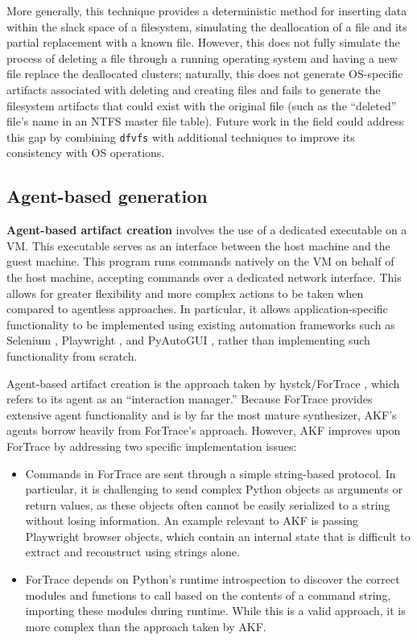 \documentclass[final,5p,times,twocolumn]{elsarticle}
\newcommand{\passthrough}[1]{#1}
\begin{document}
More generally, this technique provides a deterministic method for
inserting data within the slack space of a filesystem, simulating the
deallocation of a file and its partial replacement with a known file.
However, this does not fully simulate the process of deleting a file
through a running operating system and having a new file replace the
deallocated clusters; naturally, this does not generate OS-specific
artifacts associated with deleting and creating files and fails to
generate the filesystem artifacts that could exist with the original
file (such as the ``deleted'' file's name in an NTFS master file table).
Future work in the field could address this gap by combining
\passthrough{\lstinline!dfvfs!} with additional techniques to improve
its consistency with OS operations.

\subsection{Agent-based generation}\label{agent-based-generation}

\textbf{Agent-based artifact creation} involves the use of a dedicated
executable on a VM. This executable serves as an interface between the
host machine and the guest machine. This program runs commands natively
on the VM on behalf of the host machine, accepting commands over a
dedicated network interface. This allows for greater flexibility and
more complex actions to be taken when compared to agentless approaches.
In particular, it allows application-specific functionality to be
implemented using existing automation frameworks such as Selenium
\cite{SeleniumHQSelenium2025}, Playwright
\cite{MicrosoftPlaywrightpython2025}, and PyAutoGUI
\cite{sweigartAsweigartPyautogui2025}, rather than implementing such
functionality from scratch.

Agent-based artifact creation is the approach taken by hystck/ForTrace
\cite{gobelNovelApproachGenerating2020,gobelForTraceHolisticForensic2022},
which refers to its agent as an ``interaction manager.'' Because
ForTrace provides extensive agent functionality and is by far the most
mature synthesizer, AKF's agents borrow heavily from ForTrace's
approach. However, AKF improves upon ForTrace by addressing two specific
implementation issues:

\begin{itemize}
\item
  Commands in ForTrace are sent through a simple string-based protocol.
  In particular, it is challenging to send complex Python objects as
  arguments or return values, as these objects often cannot be easily
  serialized to a string without losing information. An example relevant
  to AKF is passing Playwright browser objects, which contain an
  internal state that is difficult to extract and reconstruct using
  strings alone.
\item
  ForTrace depends on Python's runtime introspection to discover the
  correct modules and functions to call based on the contents of a
  command string, importing these modules during runtime. While this is
  a valid approach, it is more complex than the approach taken by AKF.
\end{itemize}
\end{document}
